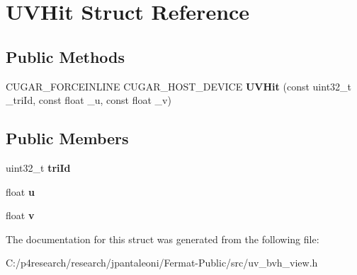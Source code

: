 \hypertarget{struct_u_v_hit}{}\section{U\+V\+Hit Struct Reference}
\label{struct_u_v_hit}
\subsection*{Public Methods}
\begin{DoxyCompactItemize}
\item 
\mbox{\label{struct_u_v_hit_a4735ba36e085d62f9269e32434fd40a8}} 
C\+U\+G\+A\+R\+\_\+\+F\+O\+R\+C\+E\+I\+N\+L\+I\+NE C\+U\+G\+A\+R\+\_\+\+H\+O\+S\+T\+\_\+\+D\+E\+V\+I\+CE {\bfseries U\+V\+Hit} (const uint32\+\_\+t \+\_\+tri\+Id, const float \+\_\+u, const float \+\_\+v)
\end{DoxyCompactItemize}
\subsection*{Public Members}
\begin{DoxyCompactItemize}
\item 
\mbox{\label{struct_u_v_hit_a7539a2072a06b1f2d12f51a10e8f454b}} 
uint32\+\_\+t {\bfseries tri\+Id}
\item 
\mbox{\label{struct_u_v_hit_a66bbddcda552b6ada2febeaaceb6e59c}} 
float {\bfseries u}
\item 
\mbox{\label{struct_u_v_hit_af3cbf3886d7359c9ec3992ad3b9d9875}} 
float {\bfseries v}
\end{DoxyCompactItemize}


The documentation for this struct was generated from the following file\+:\begin{DoxyCompactItemize}
\item 
C\+:/p4research/research/jpantaleoni/\+Fermat-\/\+Public/src/uv\+\_\+bvh\+\_\+view.\+h\end{DoxyCompactItemize}
